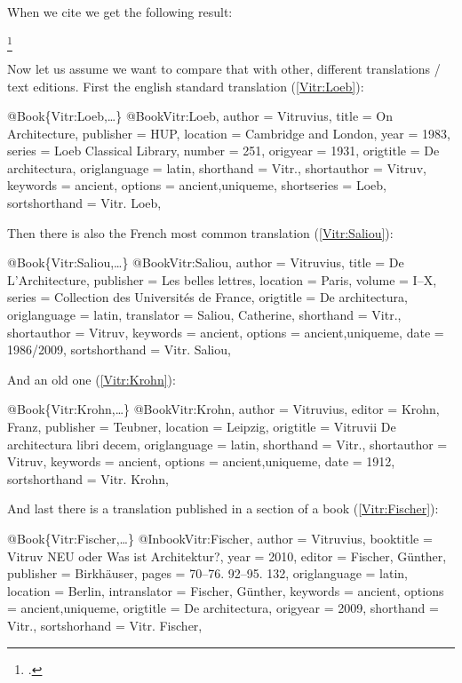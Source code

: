 \documentclass[a4paper,
10pt,
greek,
french,
spanish,
italian,
ngerman,
english
]{ltxdoc}
\begin{document}
When we cite \citeauthor{Vitr} we get the following result:
\begin{example}
\footnote{\cite[1,1,2]{Vitr}.}
\end{example}
Now let us assume we want to compare that with other, different translations / text editions. 
First the english standard translation (\cref{Vitr:Loeb}):
\begin{bibexample}[label=Vitr:Loeb]{{@}Book\{Vitr:Loeb,…\}}
@Book{Vitr:Loeb,
  author        = {Vitruvius},
  title         = {On Architecture},
  publisher     = HUP, %
  location      = {Cambridge and London},
  year          = {1983},
  series        = {Loeb Classical Library},
  number        = {251},
  origyear      = {1931},
  origtitle     = {De architectura},
  origlanguage  = {latin},
  shorthand     = {Vitr.},
  shortauthor   = {Vitruv},
  keywords      = {ancient},
  options       = {ancient,uniqueme},
  shortseries   = {Loeb},
  sortshorthand = {Vitr. Loeb},
}
\end{bibexample}
Then there is also the French most common translation (\cref{Vitr:Saliou}):
\begin{bibexample}[label=Vitr:Saliou]{{@}Book\{Vitr:Saliou,…\}}
@Book{Vitr:Saliou,
  author        = {Vitruvius},
  title         = {De L'Architecture},
  publisher     = {Les belles lettres},
  location      = Paris, %
  volume        = {I--X},
  series        = {Collection des Universités de France},
  origtitle     = {De architectura},
  origlanguage  = {latin},
  translator    = {Saliou, Catherine},
  shorthand     = {Vitr.},
  shortauthor   = {Vitruv},
  keywords      = {ancient},
  options       = {ancient,uniqueme},
  date          = {1986/2009},
  sortshorthand = {Vitr. Saliou},
}
\end{bibexample}
And an old one (\cref{Vitr:Krohn}):
\begin{bibexample}[label=Vitr:Krohn]{{@}Book\{Vitr:Krohn,…\}}
@Book{Vitr:Krohn,
  author        = {Vitruvius},
  editor        = {Krohn, Franz},
  publisher     = {Teubner},
  location      = Leipzig, %
  origtitle     = {Vitruvii De architectura libri decem},
  origlanguage  = {latin},
  shorthand     = {Vitr.},
  shortauthor   = {Vitruv},
  keywords      = {ancient},
  options       = {ancient,uniqueme},
  date          = {1912},
  sortshorthand = {Vitr. Krohn},
}
\end{bibexample}

And last there is a translation published in a section of a book (\cref{Vitr:Fischer}):
\begin{bibexample}[label=Vitr:Fischer]{{@}Book\{Vitr:Fischer,…\}}
@Inbook{Vitr:Fischer,
  author       = {Vitruvius},
  booktitle    = {Vitruv NEU oder Was ist Architektur?},
  year         = {2010},
  editor       = {Fischer, Günther},
  publisher    = {Birkhäuser},
  pages        = {70--76. 92--95. 132\psq},
  origlanguage = {latin},
  location     = Berlin, %
  intranslator = {Fischer, Günther},
  keywords     = {ancient},
  options      = {ancient,uniqueme},
  origtitle    = {De architectura},
  origyear     = {2009},
  shorthand    = {Vitr.},
  sortshorhand = {Vitr. Fischer},
}
\end{bibexample}
\end{document}
